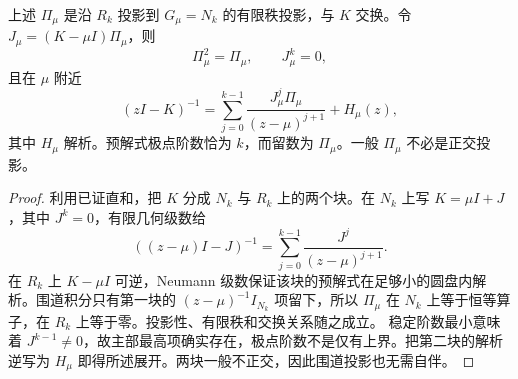 \begin{proposition}[谱投影与预解式的主部]
上述 $\Pi_\mu$ 是沿 $R_k$ 投影到 $G_\mu=N_k$ 的有限秩投影，与 $K$ 交换。令 $J_\mu=(K-\mu I)\Pi_\mu$，则
\[
\Pi_\mu^2=\Pi_\mu,\qquad J_\mu^k=0,
\]
且在 $\mu$ 附近
\[
(zI-K)^{-1}
=\sum_{j=0}^{k-1}\frac{J_\mu^j\Pi_\mu}{(z-\mu)^{j+1}}
+H_\mu(z),
\]
其中 $H_\mu$ 解析。预解式极点阶数恰为 $k$，而留数为 $\Pi_\mu$。一般 $\Pi_\mu$ 不必是正交投影。
\end{proposition}
\begin{proof}
利用已证直和，把 $K$ 分成 $N_k$ 与 $R_k$ 上的两个块。在 $N_k$ 上写 $K=\mu I+J$，其中 $J^k=0$，有限几何级数给
\[
((z-\mu)I-J)^{-1}
=\sum_{j=0}^{k-1}\frac{J^j}{(z-\mu)^{j+1}}.
\]
在 $R_k$ 上 $K-\mu I$ 可逆，Neumann 级数保证该块的预解式在足够小的圆盘内解析。围道积分只有第一块的 $(z-\mu)^{-1}I_{N_k}$ 项留下，所以 $\Pi_\mu$ 在 $N_k$ 上等于恒等算子，在 $R_k$ 上等于零。投影性、有限秩和交换关系随之成立。
稳定阶数最小意味着 $J^{k-1}\ne0$，故主部最高项确实存在，极点阶数不是仅有上界。把第二块的解析逆写为 $H_\mu$ 即得所述展开。两块一般不正交，因此围道投影也无需自伴。
\end{proof}


